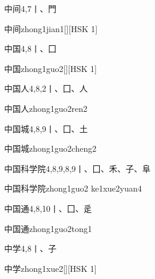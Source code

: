 \begin{entry}{中间}{4,7}{⼁、⾨}
  \begin{phonetics}{中间}{zhong1jian1}[][HSK 1]
  \end{phonetics}
\end{entry}

\begin{entry}{中国}{4,8}{⼁、⼞}
  \begin{phonetics}{中国}{zhong1guo2}[][HSK 1]
  \end{phonetics}
\end{entry}

\begin{entry}{中国人}{4,8,2}{⼁、⼞、⼈}
  \begin{phonetics}{中国人}{zhong1guo2ren2}
  \end{phonetics}
\end{entry}

\begin{entry}{中国城}{4,8,9}{⼁、⼞、⼟}
  \begin{phonetics}{中国城}{zhong1guo2cheng2}
  \end{phonetics}
\end{entry}

\begin{entry}{中国科学院}{4,8,9,8,9}{⼁、⼞、⽲、⼦、⾩}
  \begin{phonetics}{中国科学院}{zhong1guo2 ke1xue2yuan4}
  \end{phonetics}
\end{entry}

\begin{entry}{中国通}{4,8,10}{⼁、⼞、⾡}
  \begin{phonetics}{中国通}{zhong1guo2tong1}
  \end{phonetics}
\end{entry}

\begin{entry}{中学}{4,8}{⼁、⼦}
  \begin{phonetics}{中学}{zhong1xue2}[][HSK 1]
  \end{phonetics}
\end{entry}


